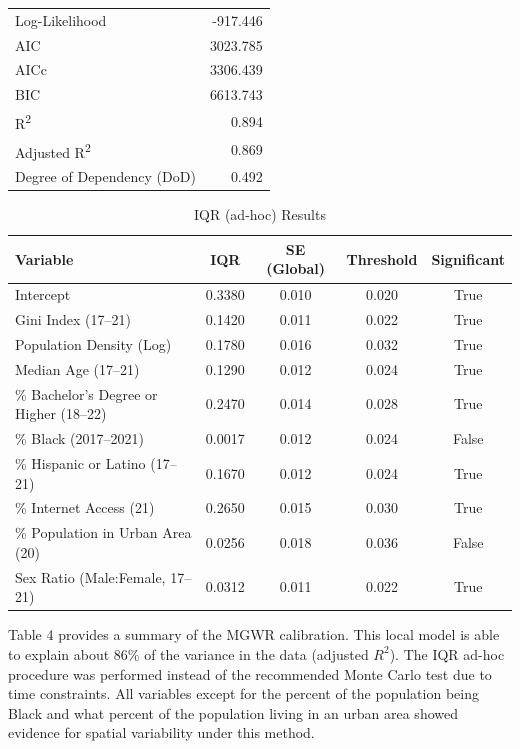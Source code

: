 \documentclass[
]{article}
\begin{document}
\begin{table}[H]
\begin{tabular}{lccccc}
Log-Likelihood           & \multicolumn{5}{r}{-917.446} \\
AIC                      & \multicolumn{5}{r}{3023.785} \\
AICc                     & \multicolumn{5}{r}{3306.439} \\
BIC                      & \multicolumn{5}{r}{6613.743} \\
R\textsuperscript{2}     & \multicolumn{5}{r}{0.894} \\
Adjusted R\textsuperscript{2} & \multicolumn{5}{r}{0.869} \\
Degree of Dependency (DoD) & \multicolumn{5}{r}{0.492} \\ \hline
\end{tabular}
\end{table}

\begin{table}[H]
\renewcommand{\arraystretch}{1.3} %
\setlength{\tabcolsep}{12pt} %
\centering
\caption{IQR (ad-hoc) Results}
\label{tab:iqr_results}
\begin{tabular}{lcccc}
\hline
\textbf{Variable} & \textbf{IQR} & \textbf{SE (Global)} & \textbf{Threshold} & \textbf{Significant} \\ \hline
Intercept                & 0.3380 & 0.010 & 0.020 & True \\ 
Gini Index (17–21)       & 0.1420 & 0.011 & 0.022 & True \\ 
Population Density (Log) & 0.1780 & 0.016 & 0.032 & True \\ 
Median Age (17–21)       & 0.1290 & 0.012 & 0.024 & True \\ 
\% Bachelor's Degree or Higher (18–22) & 0.2470 & 0.014 & 0.028 & True \\ 
\% Black (2017–2021)     & 0.0017 & 0.012 & 0.024 & False \\ 
\% Hispanic or Latino (17–21) & 0.1670 & 0.012 & 0.024 & True \\ 
\% Internet Access (21)  & 0.2650 & 0.015 & 0.030 & True \\ 
\% Population in Urban Area (20) & 0.0256 & 0.018 & 0.036 & False \\ 
Sex Ratio (Male:Female, 17–21) & 0.0312 & 0.011 & 0.022 & True \\ 
\hline
\end{tabular}
\end{table}

\newpage

Table 4 provides a summary of the MGWR calibration. This local model is
able to explain about \(86\%\) of the variance in the data (adjusted
\(R^{2}\)). The IQR ad-hoc procedure was performed instead of the
recommended Monte Carlo test due to time constraints. All variables
except for the percent of the population being Black and what percent of
the population living in an urban area showed evidence for spatial
variability under this method.
\end{document}
